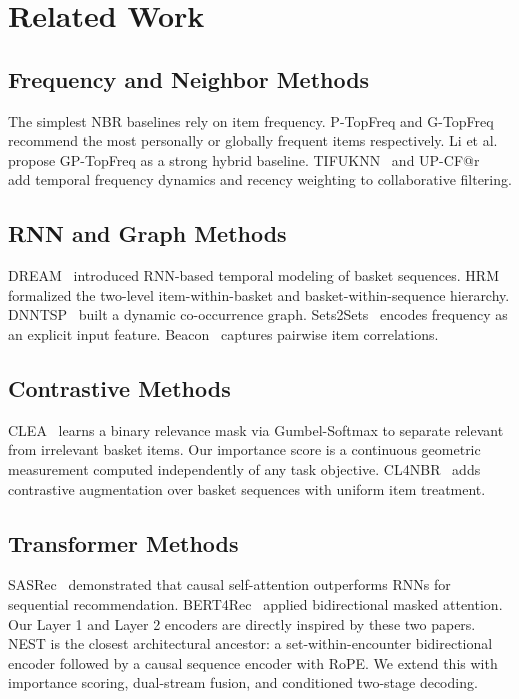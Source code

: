 \documentclass[conference]{IEEEtran}
\begin{document}
\section{Related Work}
\label{sec:related}

\subsection{Frequency and Neighbor Methods}
The simplest NBR baselines rely on item frequency.
P-TopFreq and G-TopFreq recommend the most personally or globally
frequent items respectively. Li et al.~\cite{li2023next} propose
GP-TopFreq as a strong hybrid baseline. TIFUKNN~\cite{hu2020modeling} and
UP-CF@r~\cite{faggioli2020recency} add temporal frequency dynamics and
recency weighting to collaborative filtering.

\subsection{RNN and Graph Methods}
DREAM~\cite{yu2016dynamic} introduced RNN-based temporal modeling of
basket sequences. HRM~\cite{wang2015learning} formalized the two-level
item-within-basket and basket-within-sequence hierarchy.
DNNTSP~\cite{yu2020predicting} built a dynamic co-occurrence graph.
Sets2Sets~\cite{hu2019sets2sets} encodes frequency as an explicit input feature.
Beacon~\cite{le2019correlation} captures pairwise item correlations.

\subsection{Contrastive Methods}
CLEA~\cite{qin2021world} learns a binary relevance mask via Gumbel-Softmax to separate relevant from irrelevant basket items. Our importance score is a continuous geometric measurement computed independently of any task objective.
CL4NBR~\cite{zhu2025contrastive} adds contrastive augmentation over basket sequences with uniform item treatment.

\subsection{Transformer Methods}
SASRec~\cite{kang2018self} demonstrated that causal self-attention
outperforms RNNs for sequential recommendation.
BERT4Rec~\cite{sun2019bert4rec} applied bidirectional masked attention.
Our Layer 1 and Layer 2 encoders are directly inspired by these two papers. NEST is the closest architectural ancestor: a set-within-encounter bidirectional encoder followed by a causal sequence encoder with RoPE. We extend this with importance scoring, dual-stream fusion, and conditioned two-stage decoding.
\end{document}
